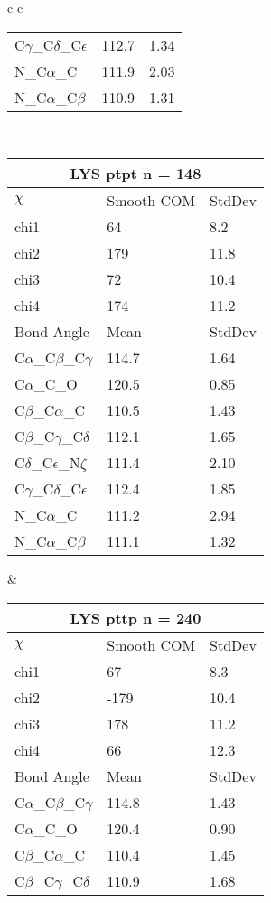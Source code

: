 \begin{longtable}{ c c }
\begin{tabular}{ l l l }
  C$\gamma$\_C$\delta$\_C$\epsilon$ & 112.7 & 1.34\\
  N\_C$\alpha$\_C & 111.9 & 2.03\\
  N\_C$\alpha$\_C$\beta$ & 110.9 & 1.31\\
  \bottomrule
  \end{tabular}
  \\
  \begin{tabular}{ l l l }
  \toprule
  \multicolumn{3}{c}{LYS \textbf{ptpt} n = 148} \\ \toprule
  $\chi$       & Smooth COM & StdDev \\ \midrule
  chi1 & 64 & 8.2 \\ 
  chi2 & 179 & 11.8 \\ 
  chi3 & 72 & 10.4 \\ 
  chi4 & 174 & 11.2 \\ \midrule
  Bond Angle   & Mean     & StdDev \\ \midrule
  C$\alpha$\_C$\beta$\_C$\gamma$ & 114.7 & 1.64\\
  C$\alpha$\_C\_O & 120.5 & 0.85\\
  C$\beta$\_C$\alpha$\_C & 110.5 & 1.43\\
  C$\beta$\_C$\gamma$\_C$\delta$ & 112.1 & 1.65\\
  C$\delta$\_C$\epsilon$\_N$\zeta$ & 111.4 & 2.10\\
  C$\gamma$\_C$\delta$\_C$\epsilon$ & 112.4 & 1.85\\
  N\_C$\alpha$\_C & 111.2 & 2.94\\
  N\_C$\alpha$\_C$\beta$ & 111.1 & 1.32\\
  \bottomrule
  \end{tabular}
  &
  \begin{tabular}{ l l l }
  \toprule
  \multicolumn{3}{c}{LYS \textbf{pttp} n = 240} \\ \toprule
  $\chi$       & Smooth COM & StdDev \\ \midrule
  chi1 & 67 & 8.3 \\ 
  chi2 & -179 & 10.4 \\ 
  chi3 & 178 & 11.2 \\ 
  chi4 & 66 & 12.3 \\ \midrule
  Bond Angle   & Mean     & StdDev \\ \midrule
  C$\alpha$\_C$\beta$\_C$\gamma$ & 114.8 & 1.43\\
  C$\alpha$\_C\_O & 120.4 & 0.90\\
  C$\beta$\_C$\alpha$\_C & 110.4 & 1.45\\
  C$\beta$\_C$\gamma$\_C$\delta$ & 110.9 & 1.68\\

\end{tabular}
\end{longtable}
